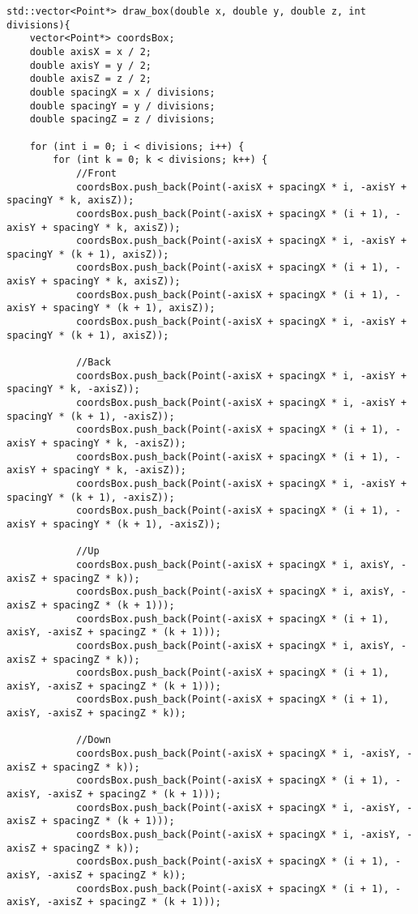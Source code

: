 \begin{lstlisting}
std::vector<Point*> draw_box(double x, double y, double z, int divisions){
    vector<Point*> coordsBox;
    double axisX = x / 2;
    double axisY = y / 2;
    double axisZ = z / 2;
    double spacingX = x / divisions;
    double spacingY = y / divisions;
    double spacingZ = z / divisions;

    for (int i = 0; i < divisions; i++) {
        for (int k = 0; k < divisions; k++) {
            //Front
            coordsBox.push_back(Point(-axisX + spacingX * i, -axisY + spacingY * k, axisZ));
            coordsBox.push_back(Point(-axisX + spacingX * (i + 1), -axisY + spacingY * k, axisZ));
            coordsBox.push_back(Point(-axisX + spacingX * i, -axisY + spacingY * (k + 1), axisZ));
            coordsBox.push_back(Point(-axisX + spacingX * (i + 1), -axisY + spacingY * k, axisZ));
            coordsBox.push_back(Point(-axisX + spacingX * (i + 1), -axisY + spacingY * (k + 1), axisZ));
            coordsBox.push_back(Point(-axisX + spacingX * i, -axisY + spacingY * (k + 1), axisZ));

            //Back
            coordsBox.push_back(Point(-axisX + spacingX * i, -axisY + spacingY * k, -axisZ));
            coordsBox.push_back(Point(-axisX + spacingX * i, -axisY + spacingY * (k + 1), -axisZ));
            coordsBox.push_back(Point(-axisX + spacingX * (i + 1), -axisY + spacingY * k, -axisZ));
            coordsBox.push_back(Point(-axisX + spacingX * (i + 1), -axisY + spacingY * k, -axisZ));
            coordsBox.push_back(Point(-axisX + spacingX * i, -axisY + spacingY * (k + 1), -axisZ));
            coordsBox.push_back(Point(-axisX + spacingX * (i + 1), -axisY + spacingY * (k + 1), -axisZ));

            //Up
            coordsBox.push_back(Point(-axisX + spacingX * i, axisY, -axisZ + spacingZ * k));
            coordsBox.push_back(Point(-axisX + spacingX * i, axisY, -axisZ + spacingZ * (k + 1)));
            coordsBox.push_back(Point(-axisX + spacingX * (i + 1), axisY, -axisZ + spacingZ * (k + 1)));
            coordsBox.push_back(Point(-axisX + spacingX * i, axisY, -axisZ + spacingZ * k));
            coordsBox.push_back(Point(-axisX + spacingX * (i + 1), axisY, -axisZ + spacingZ * (k + 1)));
            coordsBox.push_back(Point(-axisX + spacingX * (i + 1), axisY, -axisZ + spacingZ * k));

            //Down
            coordsBox.push_back(Point(-axisX + spacingX * i, -axisY, -axisZ + spacingZ * k));
            coordsBox.push_back(Point(-axisX + spacingX * (i + 1), -axisY, -axisZ + spacingZ * (k + 1)));
            coordsBox.push_back(Point(-axisX + spacingX * i, -axisY, -axisZ + spacingZ * (k + 1)));
            coordsBox.push_back(Point(-axisX + spacingX * i, -axisY, -axisZ + spacingZ * k));
            coordsBox.push_back(Point(-axisX + spacingX * (i + 1), -axisY, -axisZ + spacingZ * k));
            coordsBox.push_back(Point(-axisX + spacingX * (i + 1), -axisY, -axisZ + spacingZ * (k + 1)));


\end{lstlisting}
